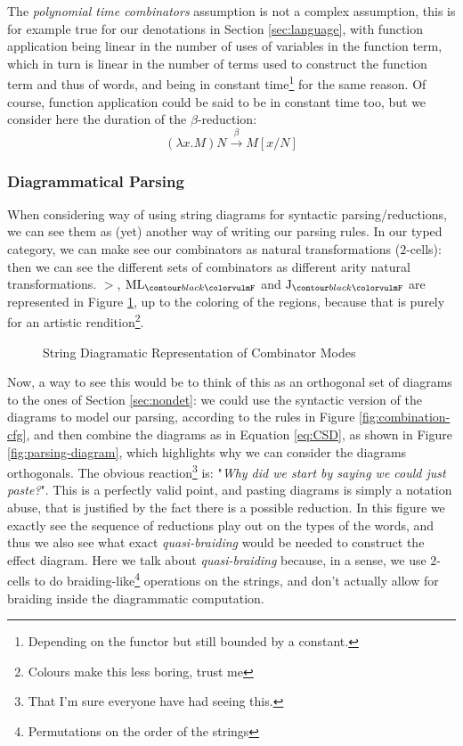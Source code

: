 The \emph{polynomial time combinators} assumption is not a complex assumption,
this is for example true for our denotations in Section \ref{sec:language},
with function application being linear in the number of uses of variables in
the function term, which in turn is linear in the number of terms used to
construct the function term and thus of words, and \fmap being in constant
time\footnote{Depending on the functor but still bounded by a constant.} for
the same reason.
Of course, function application could be said to be in constant time too, but
we consider here the duration of the $\beta$-reduction:
\begin{equation*}
	\left(\lambda x. M\right)N \xrightarrow{\beta} M\left[x / N\right]
\end{equation*}

\subsubsection{Diagrammatical Parsing}
\label{subsubsec:diagram-parsing}
When considering 
way of using string diagrams for syntactic parsing/reductions, we can see them
as (yet) another way of writing our parsing rules.
In our typed category, we can make see our combinators as natural
transformations ($2$-cells): then we can see the different sets of combinators
as different arity natural transformations.
$>$, $\combML_{\f{F}}$ and $\combJ_{\f{F}}$ are represented in
Figure \ref{fig:combinator-sd}, up to the coloring of the regions, because that
is purely for an artistic rendition\footnote{Colours make this less boring,
	trust me}.

\begin{figure}
	\centering
	\caption{String Diagramatic Representation of Combinator Modes}
	\label{fig:combinator-sd}
\end{figure}

Now, a way to see this would be to think of this as an orthogonal set of
diagrams to the ones of Section \ref{sec:nondet}: we could use the syntactic
version of the diagrams to model our parsing, according to the rules in
Figure \ref{fig:combination-cfg}, and then combine the diagrams as in Equation
\ref{eq:CSD}, as shown in Figure \ref{fig:parsing-diagram}, which highlights
why we can consider the diagrams orthogonals.
The obvious reaction\footnote{That I'm sure everyone have had seeing this.} is:
"\emph{Why did we start by saying we could just paste?}".
This is a perfectly valid point, and pasting diagrams is simply a notation
abuse, that is justified by the fact there is a possible reduction.
In this figure we exactly see the sequence of reductions play out on the types
of the words, and thus we also see what exact \emph{quasi-braiding} would be
needed to construct the effect diagram.
Here we talk about \emph{quasi-braiding} because, in a sense, we use $2$-cells
to do braiding-like\footnote{Permutations on the order of the strings}
operations on the strings, and don't actually allow for braiding inside the
diagrammatic computation.

